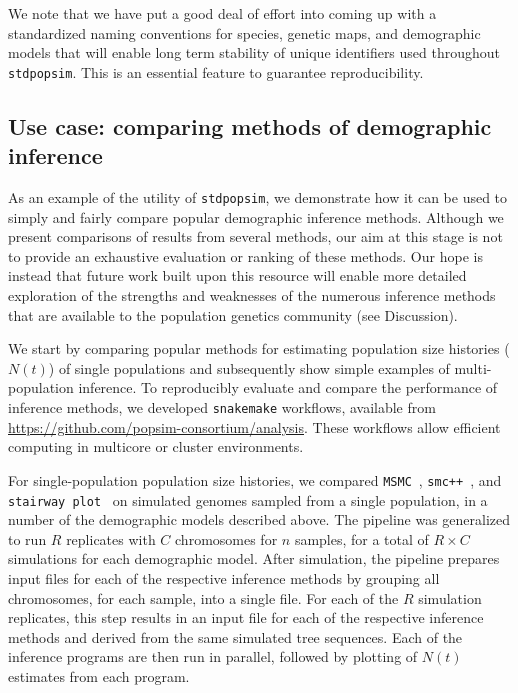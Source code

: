 \documentclass[12pt,halfline,a4paper]{ouparticle}
\newcommand{\stdpopsim}{\texttt{stdpopsim}\xspace}
\newcommand{\MSMC}{\texttt{MSMC}\xspace}
\newcommand{\smcpp}{\texttt{smc++}\xspace}
\newcommand{\stairwayplot}{\texttt{stairway plot}\xspace}
\begin{document}
We note that we have put a good deal of effort into coming up with a standardized naming
conventions for species, genetic maps, and demographic models that will enable long term stability
of unique identifiers used throughout \stdpopsim. This is an essential feature to guarantee reproducibility.
\subsection*{Use case: comparing methods of demographic inference}
As an example of the utility of \stdpopsim, we demonstrate how it can be used
to simply and fairly compare popular demographic inference methods.
Although we present comparisons of results from several
methods, our aim at this stage is not to provide an exhaustive
evaluation or ranking of these methods. Our hope is instead that future work built upon this resource
will enable more detailed exploration of the strengths and weaknesses of the numerous
inference methods that are available to the population genetics community
(see Discussion).

We start by comparing popular methods for estimating
population size histories ($N(t)$) of single populations and subsequently
show simple examples of multi-population inference.
To reproducibly evaluate and compare the performance of inference methods, we developed
\texttt{snakemake} \citep{koster2012snakemake} workflows,
available from \url{https://github.com/popsim-consortium/analysis}.
These workflows allow efficient computing in multicore or cluster environments.

For single-population population size histories, we compared
\MSMC~\citep{schiffels2014inferring}, \smcpp~\citep{terhorst2017robust}, and
\stairwayplot~\citep{liu2015exploring}
 on simulated genomes sampled from a single population,
in a number of the demographic models described above. The pipeline was generalized to
run $R$ replicates with $C$ chromosomes for $n$ samples, for a total of $R \times C$
simulations for each demographic model. After simulation, the pipeline prepares
input files for each of the respective inference methods by grouping all
chromosomes, for each sample, into a single file. For each of the $R$ simulation replicates, this step results in an
input file for each of the
respective inference methods and derived from the same simulated tree sequences.
Each of the inference programs are then run in parallel, followed by plotting of
$N(t)$ estimates from each program.
\end{document}

